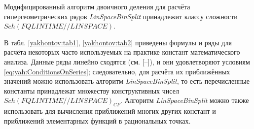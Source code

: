 \smallskip

\begin{theorem}
Модифицированный алгоритм двоичного деления для расчёта
гипергеометрических рядов {\itshape LinSpaceBinSplit}
принадлежит классу сложности $Sch(FQLINTIME//LINSPACE)$.
\end{theorem}

\smallskip

В табл. \ref{yakhontov:tab1}, \ref{yakhontov:tab2} приведены формулы
и ряды для расчёта некоторых часто используемых на практике констант
математического анализа. 
Данные ряды линейно сходятся
(см. [--]), и
они удовлетворяют условиям \eqref{eq:yah:ConditionsOnSeries};
следовательно, для расчёта их приближённых значений можно использовать алгоритм
{\itshape LinSpaceBinSplit}, то есть перечисленные константы принадлежат
множеству конструктивных чисел $Sch(FQLINTIME//LINSPACE)_{CF}$. Алгоритм
{\itshape LinSpaceBinSplit} можно также использовать для вычисления приближений
многих других констант и приближений элементарных функций в рациональных
точках.

